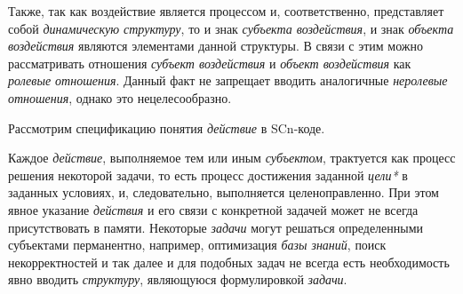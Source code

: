 Также, так как воздействие является процессом и, соответственно, представляет собой \textit{динамическую структуру}, то и знак \textit{субъекта воздействия\scnrolesign}, и знак \textit{объекта воздействия\scnrolesign} являются элементами данной структуры. В связи с этим можно рассматривать отношения \textit{субъект воздействия\scnrolesign} и \textit{объект воздействия\scnrolesign} как \textit{ролевые отношения}. Данный факт не запрещает вводить аналогичные \textit{неролевые отношения}, однако это нецелесообразно.

Рассмотрим спецификацию понятия \textit{действие} в SCn-коде.
\begin{SCn}
	\begin{scnindent}
	\end{scnindent}
\end{SCn}

Каждое \textit{действие}, выполняемое тем или иным \textit{субъектом}, трактуется как процесс решения некоторой задачи, то есть процесс достижения заданной \textit{цели*} в заданных условиях, и, следовательно, выполняется целеноправленно. При этом явное указание \textit{действия} и его связи с конкретной задачей может не всегда присутствовать в памяти. Некоторые \textit{задачи} могут решаться определенными субъектами перманентно, например, оптимизация \textit{базы знаний}, поиск некорректностей и так далее и для подобных задач не всегда есть необходимость явно вводить \textit{структуру}, являющуюся формулировкой \textit{задачи}.

